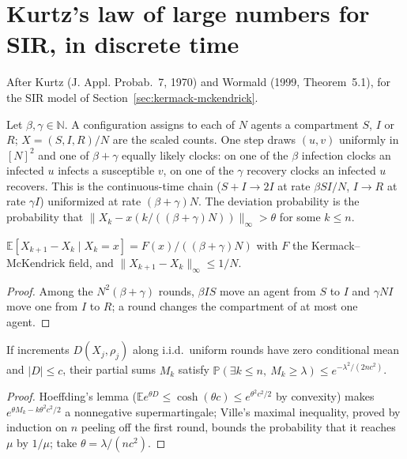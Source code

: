 \section{Kurtz's law of large numbers for SIR, in discrete time}\label{sec:kurtz}
After Kurtz (J. Appl. Probab.~7, 1970) and Wormald (1999, Theorem~5.1), for the SIR model of
Section~\ref{sec:kermack-mckendrick}.
\begin{definition}\label{def:kurtz}
\leanok{}
Let $\beta,\gamma\in\mathbb N$. A configuration assigns to each of $N$ agents a compartment
$S$, $I$ or $R$; $X=(S,I,R)/N$ are the scaled counts. One step draws $(u,v)$ uniformly in
$[N]^2$ and one of $\beta+\gamma$ equally likely clocks: on one of the $\beta$ infection clocks an
infected $u$ infects a susceptible $v$, on one of the $\gamma$ recovery clocks an infected $u$
recovers. This is the continuous-time chain ($S+I\to2I$ at rate $\beta SI/N$, $I\to R$ at rate
$\gamma I$) uniformized at rate $(\beta+\gamma)N$. The deviation probability is the probability
that $\|X_k-x(k/((\beta+\gamma)N))\|_\infty>\theta$ for some $k\le n$.
\end{definition}

\begin{lemma}\label{lem:kurtz-drift}
\leanok{}
$\mathbb E[X_{k+1}-X_k\mid X_k=x]=F(x)/((\beta+\gamma)N)$ with $F$ the Kermack--McKendrick field,
and $\|X_{k+1}-X_k\|_\infty\le1/N$.
\end{lemma}
\begin{proof}\leanok
Among the $N^2(\beta+\gamma)$ rounds, $\beta IS$ move an agent from $S$ to $I$ and $\gamma NI$ move
one from $I$ to $R$; a round changes the compartment of at most one agent.
\end{proof}

\begin{lemma}\label{lem:azuma}
\leanok
If increments $D(X_j,\rho_j)$ along i.i.d.\ uniform rounds have zero conditional mean and
$|D|\le c$, their partial sums $M_k$ satisfy
$\mathbb P(\exists k\le n,\ M_k\ge\lambda)\le e^{-\lambda^2/(2nc^2)}$.
\end{lemma}
\begin{proof}\leanok
Hoeffding's lemma ($\mathbb E e^{\theta D}\le\cosh(\theta c)\le e^{\theta^2c^2/2}$ by convexity)
makes $e^{\theta M_k-k\theta^2c^2/2}$ a nonnegative supermartingale; Ville's maximal inequality,
proved by induction on $n$ peeling off the first round, bounds the probability that it reaches
$\mu$ by $1/\mu$; take $\theta=\lambda/(nc^2)$.
\end{proof}

